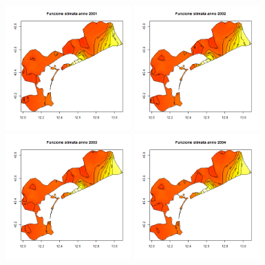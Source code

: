 \documentclass[a4paper,11pt,twoside,openright]{book}							%
\begin{document}
\begin{figure}[H]
	\includegraphics[width=0.43\textwidth ,height=0.235\textheight]{Immagini/venezia_senza_covariate/Anno2001.png}
	\includegraphics[width=0.43\textwidth ,height=0.235\textheight]{Immagini/venezia_senza_covariate/Anno2002.png}
	\includegraphics[width=0.43\textwidth ,height=0.235\textheight]{Immagini/venezia_senza_covariate/Anno2003.png}
	\includegraphics[width=0.43\textwidth ,height=0.235\textheight]{Immagini/venezia_senza_covariate/Anno2004.png}
\end{figure}
\end{document}
